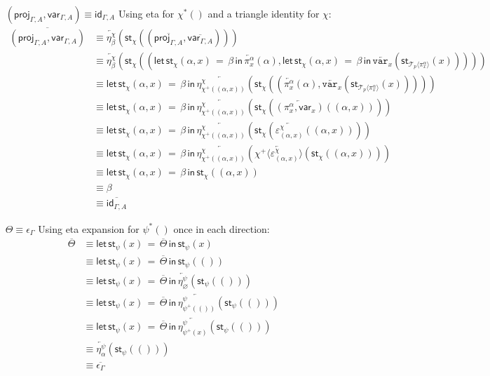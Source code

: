 \documentclass[10pt]{article}
\theoremstyle{definition}
\let\emptyset\varnothing
\newcommand{\id}{\mathsf{id}}
\newcommand{\rewrite}[2]{\overleftarrow{#1}(#2)}
\newcommand\St[2]{\ensuremath{{#1}^*(#2)}}
\newcommand\StI[2]{\ensuremath{\mathsf{st}_{#1}(#2)}}
\newcommand\StE[4]{\ensuremath{\mathsf{let} \, \StI{#1}{#3} \, = \, {#2} \, \mathsf{in} \, #4}}
\newcommand\TrPlus[2]{\ensuremath{{#1}^+(#2)}}
\newcommand\ApEl[2]{\mathcal{T}_{#1}\langle#2\rangle}
\newcommand\ApPlus[2]{\ensuremath{{#1}^+ \langle #2 \rangle }}
\newcommand{\upstairs}[1]{\overline{#1}}
\newcommand\proj[1]{\ensuremath{\mathsf{proj}_{#1}}}
\newcommand\qvar[1]{\ensuremath{\mathsf{var}_{#1}}}
\newcommand\var[1]{\ensuremath{\mathtt{var}_{#1}}}
\begin{document}
\begin{enumerate}[style = multiline, labelwidth = 80pt]
\item[{$(\proj{\Gamma,A}, \qvar{\Gamma,A}) \equiv \id_{\Gamma, A}$}] Using eta for $\St{\chi}{}$ and a triangle identity for $\chi$:
\begin{align*}
\upstairs{(\proj{\Gamma,A}, \qvar{\Gamma,A})}
&\equiv \rewrite{\eta^\chi_{\beta}}{\StI{\chi}{(\upstairs{\proj{\Gamma,A}}, \upstairs{\qvar{\Gamma,A}})}} \\
&\equiv \rewrite{\eta^\chi_{\beta}}{\StI{\chi}{(\StE{\chi}{\beta}{\alpha, x}{\rewrite{\pi^{\alpha}_{x}}{\alpha}}, \StE{\chi}{\beta}{\alpha, x}{\rewrite{\var{x}}{\StI{\ApEl{p}{\pi^{\alpha}_{x}}}{x}}})}} \\
&\equiv \StE{\chi}{\beta}{\alpha, x}{\rewrite{\eta^\chi_{\TrPlus{\chi}{(\alpha, x)}}}{\StI{\chi}{(\rewrite{\pi^{\alpha}_{x}}{\alpha}, \rewrite{\var{x}}{\StI{\ApEl{p}{\pi^{\alpha}_{x}}}{x}})}}} \\
&\equiv \StE{\chi}{\beta}{\alpha, x}{\rewrite{\eta^\chi_{\TrPlus{\chi}{(\alpha, x)}}}{\StI{\chi}{\rewrite{(\pi^{\alpha}_{x},\qvar{x})}{(\alpha, x)}}}} \\
&\equiv \StE{\chi}{\beta}{\alpha, x}{\rewrite{\eta^\chi_{\TrPlus{\chi}{(\alpha, x)}}}{\StI{\chi}{\rewrite{\varepsilon^\chi_{(\alpha, x)}}{(\alpha, x)}}}} \\
&\equiv \StE{\chi}{\beta}{\alpha, x}{\rewrite{\eta^\chi_{\TrPlus{\chi}{(\alpha, x)}}}{\rewrite{\ApPlus{\chi}{\varepsilon^\chi_{(\alpha, x)}}}{\StI{\chi}{(\alpha, x)}}}} \\
&\equiv \StE{\chi}{\beta}{\alpha, x}{\StI{\chi}{(\alpha, x)}} \\
&\equiv \beta \\
&\equiv \upstairs{\id_{\Gamma, A}}
\end{align*}

\item[$\Theta \equiv \epsilon_\Gamma$] Using eta expansion for $\St{\psi}{}$ once in each direction:
\begin{align*}
\upstairs{\Theta} 
&\equiv \StE{\psi}{\upstairs{\Theta}}{x}{\StI{\psi}{x}} \\
&\equiv \StE{\psi}{\upstairs{\Theta}}{x}{\StI{\psi}{()}} \\
&\equiv \StE{\psi}{\upstairs{\Theta}}{x}{\rewrite{\eta^\psi_{\emptyset}}{\StI{\psi}{()}}} \\
&\equiv \StE{\psi}{\upstairs{\Theta}}{x}{\rewrite{\eta^\psi_{\TrPlus{\psi}{()}}}{\StI{\psi}{()}}} \\
&\equiv \StE{\psi}{\upstairs{\Theta}}{x}{\rewrite{\eta^\psi_{\TrPlus{\psi}{x}}}{\StI{\psi}{()}}} \\
&\equiv \rewrite{\eta^\psi_{\alpha}}{\StI{\psi}{()}} \\
&\equiv \upstairs{\epsilon_\Gamma}
\end{align*}
\end{enumerate}
\end{document}
